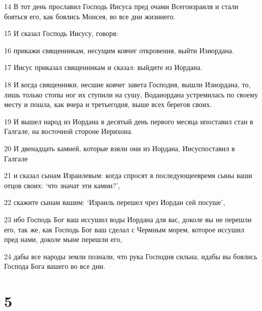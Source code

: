 \par 14 В тот день прославил Господь Иисуса пред очами Всегоизраиля и стали бояться его, как боялись Моисея, во все дни жизниего.
\par 15 И сказал Господь Иисусу, говоря:
\par 16 прикажи священникам, несущим ковчег откровения, выйти Изиордана.
\par 17 Иисус приказал священникам и сказал: выйдите из Иордана.
\par 18 И когда священники, несшие ковчег завета Господня, вышли Изиордана, то, лишь только стопы ног их ступили на сушу, Водаиордана устремилась по своему месту и пошла, как вчера и третьегодня, выше всех берегов своих.
\par 19 И вышел народ из Иордана в десятый день первого месяца ипоставил стан в Галгале, на восточной стороне Иерихона.
\par 20 И двенадцать камней, которые взяли они из Иордана, Иисуспоставил в Галгале
\par 21 и сказал сынам Израилевым: когда спросят в последующеевремя сыны ваши отцов своих: `что значат эти камни?',
\par 22 скажите сынам вашим: `Израиль перешел чрез Иордан сей посуше',
\par 23 ибо Господь Бог ваш иссушил воды Иордана для вас, доколе вы не перешли его, так же, как Господь Бог ваш сделал с Чермным морем, которое иссушил пред нами, доколе мыне перешли его,
\par 24 дабы все народы земли познали, что рука Господня сильна, идабы вы боялись Господа Бога вашего во все дни.

\chapter{5}

